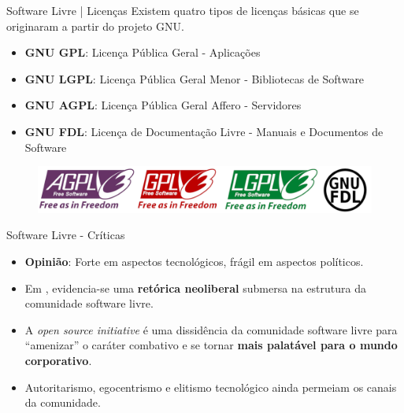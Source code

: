 \documentclass{beamer}
\begin{document}
\begin{frame}{Software Livre | Licenças}
    Existem quatro tipos de licenças básicas que se originaram a partir do projeto GNU.
    \begin{itemize}
        \item \textbf{GNU GPL}: Licença Pública Geral - Aplicações
        \item \textbf{GNU LGPL}: Licença Pública Geral Menor - Bibliotecas de Software
        \item \textbf{GNU AGPL}: Licença Pública Geral Affero - Servidores
        \item \textbf{GNU FDL}:  Licença de Documentação Livre - Manuais e Documentos de Software
    \end{itemize}
    \begin{figure}
        \centering
        \includegraphics[width=0.8\linewidth]{img/licencas.png}
    \end{figure}
\end{frame}

{
\begin{frame}[plain]
\end{frame}
}

\begin{frame}{Software Livre - Críticas}
    \begin{itemize}
        \item \textbf{Opinião}: Forte em aspectos tecnológicos, frágil em aspectos políticos.
        \item Em \cite{torres2013}, evidencia-se uma \textbf{retórica neoliberal} submersa na estrutura da comunidade software livre.
        \item A \textit{open source initiative} é uma dissidência da comunidade software livre para ``amenizar'' o caráter combativo e se tornar \textbf{mais palatável para o mundo corporativo}.
        \item Autoritarismo, egocentrismo e elitismo tecnológico ainda permeiam os canais da comunidade.
    \end{itemize}
\end{frame}
\end{document}
